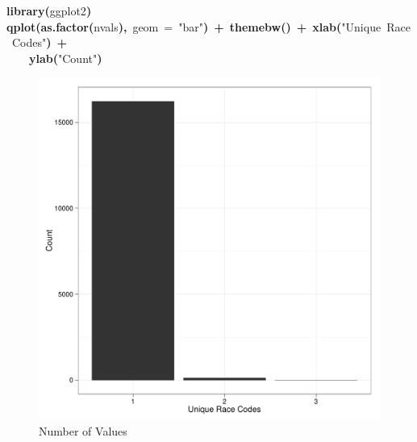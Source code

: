 \documentclass[12pt]{article}
\makeatletter
\newcommand{\hlfunctioncall}[1]{\textcolor[rgb]{0.501960784313725,0,0.329411764705882}{\textbf{#1}}}%
\newcommand{\hlstring}[1]{\textcolor[rgb]{0.6,0.6,1}{#1}}%
\newcommand{\hlkeyword}[1]{\textcolor[rgb]{0,0,0}{\textbf{#1}}}%
\newcommand{\hlargument}[1]{\textcolor[rgb]{0.690196078431373,0.250980392156863,0.0196078431372549}{#1}}%
\newcommand{\hlsymbol}[1]{\textcolor[rgb]{0,0,0}{#1}}%
\newcommand{\hlstd}[1]{\textcolor[rgb]{0,0,0}{#1}}%
\newenvironment{kframe}{%
 \def\FrameCommand##1{\hskip\@totalleftmargin \hskip-\fboxsep
 \colorbox{shadecolor}{##1}\hskip-\fboxsep
     \hskip-\linewidth \hskip-\@totalleftmargin \hskip\columnwidth}%
 \MakeFramed {\advance\hsize-\width
   \@totalleftmargin\z@ \linewidth\hsize
   \@setminipage}}%
 {\par\unskip\endMakeFramed}
\newenvironment{knitrout}{}{} %
\renewenvironment{knitrout}{\begin{footnotesize}}{\end{footnotesize}}
\makeatother
\begin{document}
\begin{knitrout}
\color{fgcolor}\begin{kframe}
\begin{flushleft}
\ttfamily\noindent
\hlfunctioncall{library}\hlkeyword{(}\hlsymbol{ggplot2}\hlkeyword{)}\hspace*{\fill}\\
\hlstd{}\hlfunctioncall{qplot}\hlkeyword{(}\hlfunctioncall{as.factor}\hlkeyword{(}\hlsymbol{nvals}\hlkeyword{)}\hlkeyword{,}{\ }\hlargument{geom}{\ }\hlargument{=}{\ }\hlstring{"{}bar"{}}\hlkeyword{)}{\ }\hlkeyword{+}{\ }\hlfunctioncall{theme\usebox{\hlnormalsizeboxunderscore}bw}\hlkeyword{(}\hlkeyword{)}{\ }\hlkeyword{+}{\ }\hlfunctioncall{xlab}\hlkeyword{(}\hlstring{"{}Unique{\ }Race{\ }Codes"{}}\hlkeyword{)}{\ }\hlkeyword{+}\hspace*{\fill}\\
\hlstd{}{\ }{\ }{\ }{\ }\hlfunctioncall{ylab}\hlkeyword{(}\hlstring{"{}Count"{}}\hlkeyword{)}\mbox{}
\normalfont
\end{flushleft}
\end{kframe}\begin{figure}[]


{\centering \includegraphics[width=.8\textwidth,height=.2\paperheight]{figure/unnamed-chunk-11} 

}

\caption[Number of Values]{Number of Values\label{fig:unnamed-chunk-11}}
\end{figure}

\end{knitrout}
\end{document}

